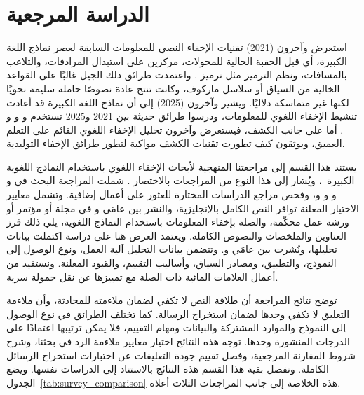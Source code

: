 \clearpage
\section{الدراسة المرجعية}
\label{sec:related_work}

استعرض  وآخرون (2021) \cite{math9212829} تقنيات الإخفاء النصي للمعلومات السابقة لعصر نماذج اللغة الكبيرة، أي قبل الحقبة الحالية للمحولات، مركزين على استبدال المرادفات، والتلاعب بالمسافات، ونظم الترميز مثل ترميز . واعتمدت طرائق ذلك الجيل غالبًا على القواعد الخالية من السياق أو سلاسل ماركوف، وكانت تنتج عادة نصوصًا حاملة سليمة نحويًا لكنها غير متماسكة دلاليًا. ويشير  وآخرون (2025) \cite{Setiadi_Ghosal_Sahu_2025} إلى أن نماذج اللغة الكبيرة قد أعادت تنشيط الإخفاء اللغوي للمعلومات، ودرسوا طرائق حديثة بين 2021 و2025 تستخدم  \cite{radford2019gpt2} و \cite{brown2020language} و \cite{touvron2023llama2} و \cite{xiao2024baichuan2}. أما على جانب الكشف، فيستعرض  وآخرون \cite{Wang_2023} تحليل الإخفاء اللغوي القائم على التعلم العميق، ويوثقون كيف تطورت تقنيات الكشف مواكبة لتطور طرائق الإخفاء التوليدية.

يستند هذا القسم إلى مراجعتنا المنهجية لأبحاث الإخفاء اللغوي باستخدام النماذج اللغوية الكبيرة~\cite{olabi2026slr}، ويُشار إلى هذا النوع من المراجعات بالاختصار . شملت المراجعة البحث في  و و و و، وفحص مراجع الدراسات المختارة للعثور على أعمال إضافية. وتشمل معايير الاختيار المعلنة توافر النص الكامل بالإنجليزية، والنشر بين عامَي  و في مجلة أو مؤتمر أو ورشة عمل محكّمة، والصلة بإخفاء المعلومات باستخدام النماذج اللغوية، يلي ذلك فرز العناوين والملخصات والنصوص الكاملة. ويعتمد العرض هنا على  دراسة اكتملت بيانات تحليلها، ونُشرت بين عامَي  و. وتتضمن بيانات التحليل آلية العمل، ونوع الوصول إلى النموذج، والتطبيق، ومصادر السياق، وأساليب التقييم، والقيود المعلنة. ونستفيد من أعمال العلامات المائية ذات الصلة مع تمييزها عن نقل حمولة سرية.

توضح نتائج المراجعة أن طلاقة النص لا تكفي لضمان ملاءمته للمحادثة، وأن ملاءمة التعليق لا تكفي وحدها لضمان استخراج الرسالة. كما تختلف الطرائق في نوع الوصول إلى النموذج والموارد المشتركة والبيانات ومهام التقييم، فلا يمكن ترتيبها اعتمادًا على الدرجات المنشورة وحدها. توجه هذه النتائج اختيار معايير ملاءمة الرد في بحثنا، وشرح شروط المقارنة المرجعية، وفصل تقييم جودة التعليقات عن اختبارات استخراج الرسائل الكاملة. وتفصل بقية هذا القسم هذه النتائج بالاستناد إلى الدراسات نفسها.
ويضع الجدول~\ref{tab:survey_comparison} هذه الخلاصة إلى جانب المراجعات الثلاث أعلاه.

